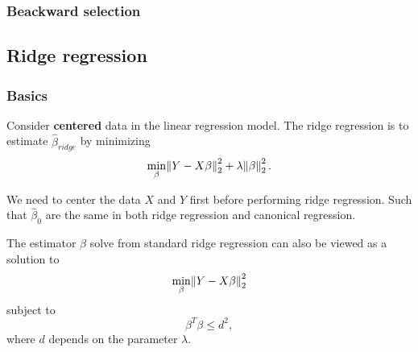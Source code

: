 \begin{refsection}
\begin{method}
\end{method}

\subsubsection{Beackward selection}


\subsection{Ridge regression}
\subsubsection{Basics}
\begin{definition}
	Consider \textbf{centered} data in the linear regression model. The ridge regression is to estimate $\hat{\beta}_{ridge}$ by minimizing
	$$\min_{\beta} \norm{Y - X\beta}_2^2 + \lambda \norm{\beta}_2^2.$$
\end{definition}

\begin{remark}
	We need to center the data $X$ and $Y$ first before performing ridge regression. Such that $\hat{\beta}_0$ are the same in both ridge regression and canonical regression.
\end{remark}

\begin{remark}\cite[352]{montgomery2012introduction}
	The estimator $\beta$ solve from standard ridge regression can also be viewed as a solution to
	$$\min_{\beta} \norm{Y - X\beta}_2^2  $$
	subject to $$\beta^T\beta \leq d^2,$$
	where $d$ depends on the parameter $\lambda$.	
\end{remark}




\end{refsection}
